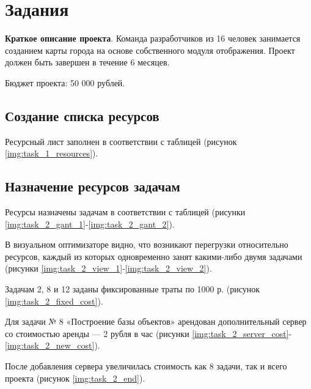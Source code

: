\chapter{Задания}

\textbf{Краткое описание проекта}. Команда разработчиков из 16 человек занимается созданием карты
города на основе собственного модуля отображения. Проект должен быть завершен в течение
6 месяцев. 

Бюджет проекта: 50 000 рублей.

\section{Создание списка ресурсов}

Ресурсный лист заполнен в соответствии с таблицей (рисунок \ref{img:task_1_resources}).

\section{Назначение ресурсов задачам}

Ресурсы назначены задачам 
в соответствии с таблицей (рисунки \ref{img:task_2_gant_1}-\ref{img:task_2_gant_2}).

В визуальном оптимизаторе видно, что возникают перегрузки относительно ресурсов, каждый из которых
одновременно занят какими-либо двумя задачами (рисунки \ref{img:task_2_view_1}-\ref{img:task_2_view_2}).

\clearpage
Задачам 2, 8 и 12 заданы фиксированные траты по 1000 р. (рисунок \ref{img:task_2_fixed_cost}).

Для задачи № 8 «Построение базы объектов» арендован дополнительный 
сервер со стоимостью аренды --- 2 рубля в час
(рисунки \ref{img:task_2_server_cost}-\ref{img:task_2_new_cost}).

После добавления сервера увеличилась стоимость как 8 задачи, так и всего проекта (рисунок \ref{img:task_2_end}).

